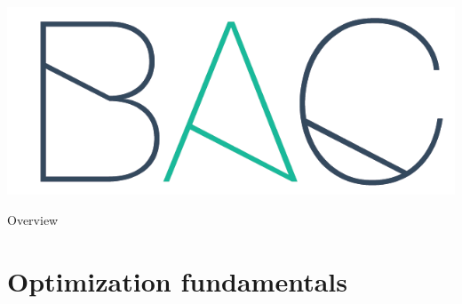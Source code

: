 \documentclass{beamer}
\title[\lecturetitle]{\lecturetitle}
\author[Derek Huang (BAC Advanced Team)]{Derek Huang}
\institute{BAC Advanced Team}
\date{March 31, 2021}
\numberwithin{equation}{section}
\begin{document}
\begin{frame}
    \titlepage
    \centering
    \includegraphics[scale = 0.1]{../bac_logo1.png}
\end{frame}

\begin{frame}{Overview}
    \tableofcontents
\end{frame}

\section{Optimization fundamentals}
\end{document}
